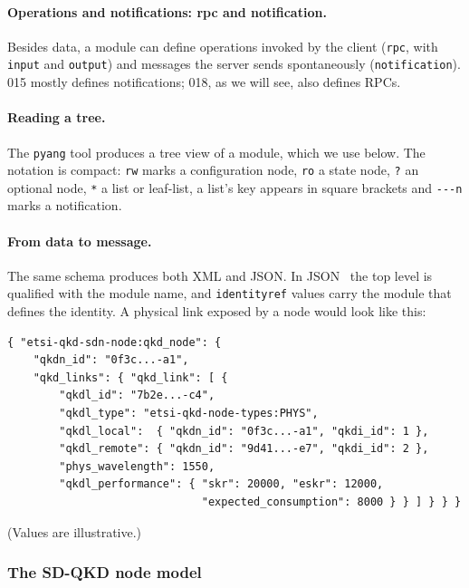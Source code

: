 \paragraph{Operations and notifications: rpc and notification.}
Besides data, a module can define operations invoked by the client
(\texttt{rpc}, with \texttt{input} and \texttt{output}) and messages the
server sends spontaneously (\texttt{notification}). 015 mostly defines
notifications; 018, as we will see, also defines RPCs.

\paragraph{Reading a tree.}
The \texttt{pyang} tool produces a tree view of a module, which we use
below. The notation is compact: \texttt{rw} marks a configuration node,
\texttt{ro} a state node, \texttt{?} an optional node, \texttt{*} a list or
leaf-list, a list's key appears in square brackets and \texttt{-{}-{}-n}
marks a notification.

\paragraph{From data to message.}
The same schema produces both XML and JSON. In JSON~\cite{rfc7951} the top
level is qualified with the module name, and \texttt{identityref} values
carry the module that defines the identity. A physical link exposed by a
node would look like this:
\begin{lstlisting}
{ "etsi-qkd-sdn-node:qkd_node": {
    "qkdn_id": "0f3c...-a1",
    "qkd_links": { "qkd_link": [ {
        "qkdl_id": "7b2e...-c4",
        "qkdl_type": "etsi-qkd-node-types:PHYS",
        "qkdl_local":  { "qkdn_id": "0f3c...-a1", "qkdi_id": 1 },
        "qkdl_remote": { "qkdn_id": "9d41...-e7", "qkdi_id": 2 },
        "phys_wavelength": 1550,
        "qkdl_performance": { "skr": 20000, "eskr": 12000,
                              "expected_consumption": 8000 } } ] } } }
\end{lstlisting}
(Values are illustrative.)

\subsubsection{The SD-QKD node model}

